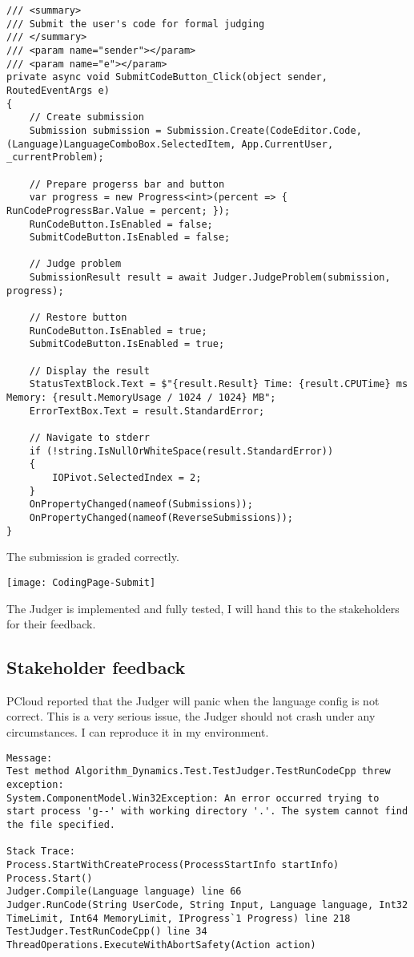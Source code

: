\documentclass[report.tex]{subfiles}
\begin{document}
\begin{verbatim}
/// <summary>
/// Submit the user's code for formal judging
/// </summary>
/// <param name="sender"></param>
/// <param name="e"></param>
private async void SubmitCodeButton_Click(object sender, RoutedEventArgs e)
{
    // Create submission
    Submission submission = Submission.Create(CodeEditor.Code, (Language)LanguageComboBox.SelectedItem, App.CurrentUser, _currentProblem);
    
    // Prepare progerss bar and button
    var progress = new Progress<int>(percent => { RunCodeProgressBar.Value = percent; });
    RunCodeButton.IsEnabled = false;
    SubmitCodeButton.IsEnabled = false;

    // Judge problem
    SubmissionResult result = await Judger.JudgeProblem(submission, progress);

    // Restore button
    RunCodeButton.IsEnabled = true;
    SubmitCodeButton.IsEnabled = true;

    // Display the result
    StatusTextBlock.Text = $"{result.Result} Time: {result.CPUTime} ms Memory: {result.MemoryUsage / 1024 / 1024} MB";
    ErrorTextBox.Text = result.StandardError;
    
    // Navigate to stderr
    if (!string.IsNullOrWhiteSpace(result.StandardError))
    {
        IOPivot.SelectedIndex = 2;
    }
    OnPropertyChanged(nameof(Submissions));
    OnPropertyChanged(nameof(ReverseSubmissions));
}
\end{verbatim}

The submission is graded correctly.

\texttt{[image: CodingPage-Submit]}

The Judger is implemented and fully tested, I will hand this to the stakeholders for their feedback.

\subsection{Stakeholder feedback}

PCloud reported that the Judger will panic when the language config is not correct. This is a very serious issue, the Judger should not crash under any circumstances. I can reproduce it in my environment.

\begin{verbatim}
Message:
Test method Algorithm_Dynamics.Test.TestJudger.TestRunCodeCpp threw exception:
System.ComponentModel.Win32Exception: An error occurred trying to start process 'g--' with working directory '.'. The system cannot find the file specified.

Stack Trace:
Process.StartWithCreateProcess(ProcessStartInfo startInfo)
Process.Start()
Judger.Compile(Language language) line 66
Judger.RunCode(String UserCode, String Input, Language language, Int32 TimeLimit, Int64 MemoryLimit, IProgress`1 Progress) line 218
TestJudger.TestRunCodeCpp() line 34
ThreadOperations.ExecuteWithAbortSafety(Action action)
\end{verbatim}
\end{document}
